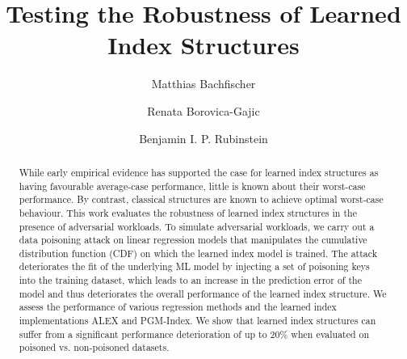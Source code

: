 \documentclass[sigconf]{acmart}
\begin{document}
\title{Testing the Robustness of Learned Index Structures}

\author{Matthias Bachfischer}

\author{Renata Borovica-Gajic}

\author{Benjamin I. P. Rubinstein}


\renewcommand{\shortauthors}{Bachfischer,  Borovica-Gajic, and Rubinstein}

\begin{abstract}
    While early empirical evidence has supported the case for learned index structures as having favourable average-case performance, little is known about their worst-case performance. By contrast, classical structures are known to achieve optimal worst-case behaviour. 
    This work evaluates the robustness of learned index structures in the presence of adversarial workloads. To simulate adversarial workloads, we carry out a data poisoning attack on linear regression models that manipulates the cumulative distribution function (CDF) on which the learned index model is trained. The attack deteriorates the fit of the underlying ML model by injecting a set of poisoning keys into the training dataset, which leads to an increase in the prediction error of the model and thus deteriorates the overall performance of the learned index structure. 
    We assess the performance of various regression methods and the learned index implementations ALEX and PGM-Index. We show that learned index structures can suffer from a significant performance deterioration of up to 20\% when evaluated on poisoned vs. non-poisoned datasets.
\end{abstract}
\end{document}
